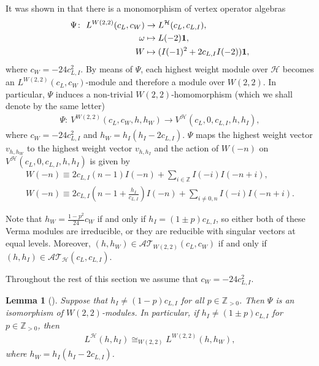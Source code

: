 \documentclass[pdftex]{sigma}
\numberwithin{equation}{section}
\newtheorem{Lemma}[Theorem]{Lemma}
\newcommand{\N}{{\mathbb Z}_{> 0} }
\newcommand{\Z}{\mathbb Z}
\newcommand{\HVir}{\mathcal H}
\begin{document}
It was shown in \cite{nas} that there is a monomorphism of vertex operator algebras
\begin{align}
\Psi \colon \ L^{W(2,2)}(c_{L},c_{W})& \rightarrow L^{\HVir}(c_{L},c_{L,I}),\label{Psi} \\
\omega & \mapsto L(-2)\mathbf{1}, \notag \\
W& \mapsto (I(-1)^{2}+2c_{L,I}I(-2))\mathbf{1}, \notag
\end{align}%
where $c_{W}=-24c_{L,I}^{2}$. By means of $\Psi $, each highest weight module over $\HVir$ becomes an \linebreak $L^{W(2,2)}(c_{L},c_{W})$-module and
therefore a module over $W(2,2) $. In particular, $\Psi $ induces a non-trivial $W(2,2)$-homomorphism (which we shall denote by the same letter)
\begin{gather*}
\Psi \colon \ V^{W(2,2)}(c_{L},c_{W},h,h_{W}) \rightarrow V^{\HVir} ( c_{L},0,c_{L,I},h,h_{I} ),
\end{gather*}
where $c_{W}=-24c_{L,I}^{2}$ and $h_{W}=h_{I}(h_{I}-2c_{L,I})$. $\Psi$ maps the highest weight vector $v_{h,h_{W}}$ to the highest weight vector
$v_{h,h_{I}}$ and the action of $W(-n)$ on $V^{\HVir} ( c_{L},0,c_{L,I},h,h_{I} )$ is given by
\begin{gather}
W(-n) \equiv 2c_{L,I}(n-1) I(-n)+\sum_{i\in \Z}I(-i)I(-n+i),\label{W u I} \\
W(-n) \equiv 2 c_{L,I}\left(n- 1 + \frac{h_I}{c_{L,I} } \right) I(- n)+\sum_{i\ne 0,n } I(-i)I(- n+i).\nonumber
\end{gather}

Note that $h_{W}=\frac{1-p^{2}}{24}c_{W}$ if and only if $h_{I}= ( 1\pm p) c_{L,I}$, so either both of these Verma modules are irreducible, or they are reducible with singular vectors at equal levels. Moreover, $ (h,h_W) \in {\mathcal {AT} }_{W(2,2)} ( c_L, c_W ) $ if and only if $(h,h_I) \in {\mathcal {AT} }_{\HVir} ( c_L, c_{L,I} )$.

Throughout the rest of this section we assume that $ c_W = -24c_{L,I}^2 $.

\begin{Lemma}[{\cite[Lemma 7.2]{nas}}] \label{psi}Suppose that $h_{I}\neq(1-p) c_{L,I}$ for all $p\in \N$. Then $\Psi$ is an isomorphism of $W(2,2)$-modules. In particular, if $ h_I \neq (1\pm p) c_{L,I} $ for $p \in \N $, then
\begin{gather*}
L^{\HVir}(h,h_I)\cong_{W(2,2)}L^{W(2,2)}(h,h_W),
\end{gather*}
where $h_W = h_I (h_I-2c_{L,I}) $.
\end{Lemma}
\end{document}
